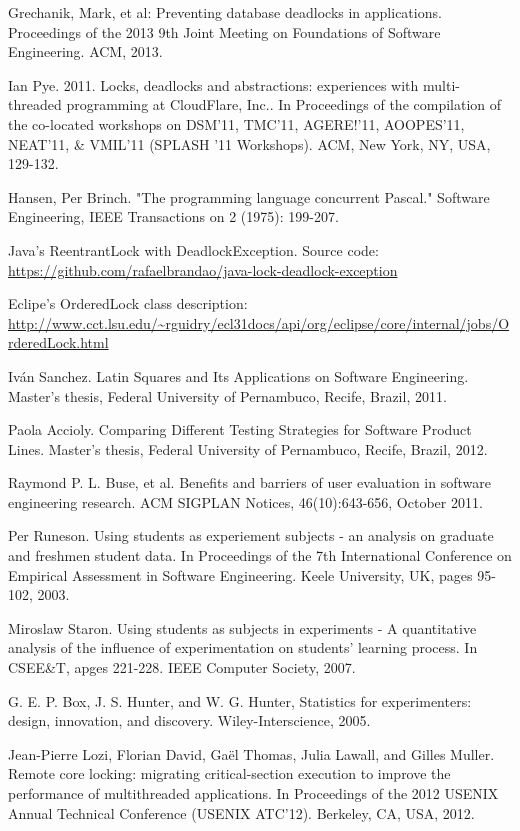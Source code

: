 \begin{thebibliography}{4}
 Grechanik, Mark, et al: Preventing database deadlocks in applications.
Proceedings of the 2013 9th Joint Meeting on Foundations of Software Engineering. ACM, 2013.

 Ian Pye. 2011. Locks, deadlocks and abstractions: experiences with multi-threaded programming at CloudFlare, Inc.. In Proceedings of the compilation of the co-located workshops on DSM'11, TMC'11, AGERE!'11, AOOPES'11, NEAT'11, \& VMIL'11 (SPLASH '11 Workshops). ACM, New York, NY, USA, 129-132.

 Hansen, Per Brinch. "The programming language concurrent Pascal." Software Engineering, IEEE Transactions on 2 (1975): 199-207.

 Java's ReentrantLock with DeadlockException. Source code: \url{https://github.com/rafaelbrandao/java-lock-deadlock-exception}

 Eclipe's OrderedLock class description: \url{http://www.cct.lsu.edu/~rguidry/ecl31docs/api/org/eclipse/core/internal/jobs/OrderedLock.html}

 Iván Sanchez. Latin Squares and Its Applications on Software Engineering. Master's thesis, Federal University of Pernambuco, Recife, Brazil, 2011.

 Paola Accioly. Comparing Different Testing Strategies for Software Product Lines. Master's thesis, Federal University of Pernambuco, Recife, Brazil, 2012.

 Raymond P. L. Buse, et al. Benefits and barriers of user evaluation in software engineering research. ACM SIGPLAN Notices, 46(10):643-656, October 2011.

 Per Runeson. Using students as experiement subjects - an analysis on graduate and freshmen student data. In Proceedings of the 7th International Conference on Empirical Assessment in Software Engineering. Keele University, UK, pages 95-102, 2003.

 Miroslaw Staron. Using students as subjects in experiments - A quantitative analysis of the influence of experimentation on students' learning process. In CSEE\&T, apges 221-228. IEEE Computer Society, 2007.

 G. E. P. Box, J. S. Hunter, and W. G. Hunter, Statistics for experimenters: design, innovation, and discovery. Wiley-Interscience, 2005.

 Jean-Pierre Lozi, Florian David, Ga\"{e}l Thomas, Julia Lawall, and Gilles Muller. Remote core locking: migrating critical-section execution to improve the performance of multithreaded applications. In Proceedings of the 2012 USENIX Annual Technical Conference (USENIX ATC'12). Berkeley, CA, USA, 2012.

\end{thebibliography}